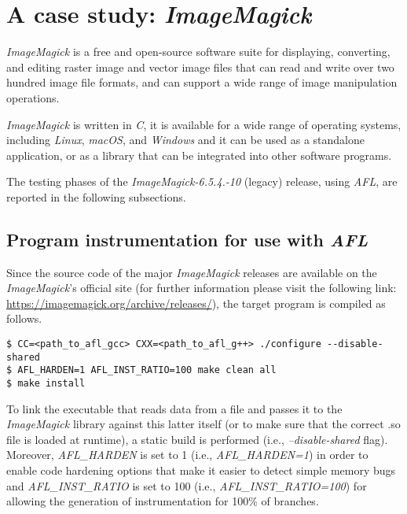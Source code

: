 \section{A case study: \textit{ImageMagick}}
\label{sec:afl}
\textit{ImageMagick}\parencite{IM} is a free and open-source software suite for displaying, converting, and editing raster image and vector image files that can read and write over two hundred image file formats, and can support a wide range of image manipulation operations.

\textit{ImageMagick} is written in \textit{C}, it is available for a wide range of operating systems, including \textit{Linux}, \textit{macOS}, and \textit{Windows} and it can be used as a standalone application, or as a library that can be integrated into other software programs.

The testing phases of the \textit{ImageMagick-6.5.4.-10}\parencite{IM6} (legacy) release, using \textit{AFL}, are reported in the following subsections.

\subsection{Program instrumentation for use with \textit{AFL}}
Since the source code of the major \textit{ImageMagick} releases are available on the \textit{ImageMagick}'s official site (for further information please visit the following link: \href{https://imagemagick.org/archive/releases/}{https://imagemagick.org/archive/releases/}), the target program is compiled as follows\parencite{AFL_guide}\parencite{AFL_readme}.
\begin{lstlisting}
$ CC=<path_to_afl_gcc> CXX=<path_to_afl_g++> ./configure --disable-shared
$ AFL_HARDEN=1 AFL_INST_RATIO=100 make clean all
$ make install
\end{lstlisting}
To link the executable that reads data from a file and passes it to the \textit{ImageMagick} library against this latter itself (or to make sure that the correct .so file is loaded at runtime), a static build is performed (i.e., \textit{--disable-shared} flag).
Moreover, \textit{AFL\_HARDEN} is set to 1 (i.e., \textit{AFL\_HARDEN=1}) in order to enable code hardening options that make it easier to detect simple memory bugs\parencite{AFL_readme}\parencite{AFL_env} and \textit{AFL\_INST\_RATIO}\parencite{AFL_env} is set to 100 (i.e., \textit{AFL\_INST\_RATIO=100}) for allowing the generation of instrumentation for 100\% of branches.


